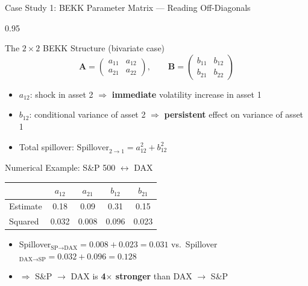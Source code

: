 \documentclass[9pt, aspectratio=169, t]{beamer}
\begin{document}
\begin{frame}{Case Study 1: BEKK Parameter Matrix --- Reading Off-Diagonals}
    \begin{cminipage}{0.95\textwidth}
    {\footnotesize
    \begin{block}{The $2 \times 2$ BEKK Structure (bivariate case)}
        \[
            \mathbf{A} = \begin{pmatrix} a_{11} & a_{12} \\ a_{21} & a_{22} \end{pmatrix}, \qquad
            \mathbf{B} = \begin{pmatrix} b_{11} & b_{12} \\ b_{21} & b_{22} \end{pmatrix}
        \]
        \begin{itemize}\setlength{\itemsep}{1pt}
            \item $a_{12}$: shock in asset 2 $\Rightarrow$ \textbf{immediate} volatility increase in asset 1
            \item $b_{12}$: conditional variance of asset 2 $\Rightarrow$ \textbf{persistent} effect on variance of asset 1
            \item Total spillover: $\text{Spillover}_{2 \rightarrow 1} = a_{12}^2 + b_{12}^2$
        \end{itemize}
    \end{block}
    \begin{exampleblock}{Numerical Example: S\&P 500 $\leftrightarrow$ DAX}
        {\small
        \begin{center}
        \begin{tabular}{l|cc|cc}
            \hline
            & $a_{12}$ & $a_{21}$ & $b_{12}$ & $b_{21}$ \\
            \hline
            Estimate & 0.18 & 0.09 & 0.31 & 0.15 \\
            Squared  & 0.032 & 0.008 & 0.096 & 0.023 \\
            \hline
        \end{tabular}
        \end{center}
        }
        \begin{itemize}\setlength{\itemsep}{0pt}
            \item Spillover$_{\text{SP}\rightarrow\text{DAX}} = 0.008 + 0.023 = 0.031$ \quad vs.\ Spillover$_{\text{DAX}\rightarrow\text{SP}} = 0.032 + 0.096 = 0.128$
            \item $\Rightarrow$ S\&P $\rightarrow$ DAX is \textbf{4$\times$ stronger} than DAX $\rightarrow$ S\&P
        \end{itemize}
    \end{exampleblock}
    }
    \end{cminipage}
\end{frame}
\end{document}

